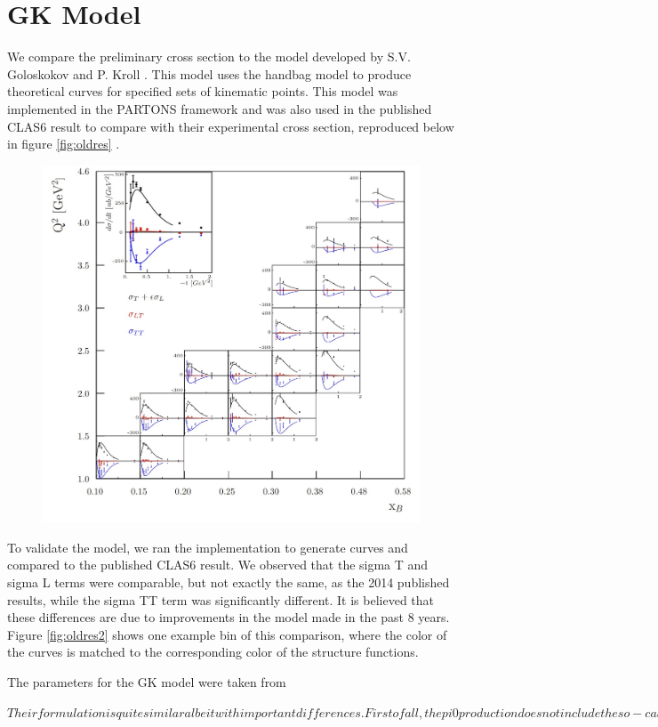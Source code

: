 \section{GK Model}

We compare the preliminary cross section to the model developed by S.V. Goloskokov and P. Kroll \cite{Goloskokov2010AnElectroproduction}. This model uses the handbag model to produce theoretical curves for specified sets of kinematic points. This model was implemented in the PARTONS framework \cite{Berthou2018PARTONS:Software} and was also used in the published CLAS6 result to compare with their experimental cross section, reproduced below in figure \ref{fig:oldres} \cite{Bedlinskiy2014ExclusiveAl.}.



\begin{figure}[hbt]
	\centering
	\includegraphics[page=6,width=0.6\linewidth]{Chapters/Ch5-FurtherAnalysis/pics/clas6comp.jpg}
\end{figure}\label{fig:oldres}

To validate the model, we ran the implementation to generate curves and compared to the published CLAS6 result. We observed that the sigma T and sigma L terms were comparable, but not exactly the same, as the 2014 published results, while the sigma TT term was significantly different. It is believed that these differences are due to improvements in the model made in the past 8 years. Figure \ref{fig:oldres2} shows one example bin of this comparison, where the color of the curves is matched to the corresponding color of the structure functions.


The parameters for the GK model were taken from 

$
Their formulation is quite similar albeit with important differences. First of all, the pi0 production does not include the so-called pion-pole contribution (see Eq. 4.39 - 4.42 in my thesis). Moreover, their handbag contributions are slightly different. Their differences at the handbag level are discussed in Eq. 4.37 and 4.38 in my thesis. $

